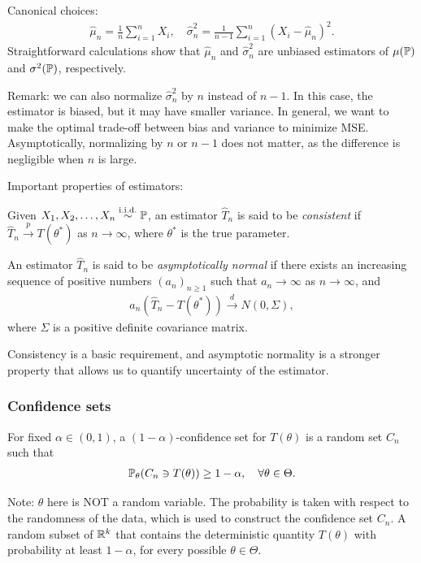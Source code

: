 \documentclass[11pt,letterpaper]{article}
\numberwithin{theorem}{lecture}
\numberwithin{proposition}{lecture}
\numberwithin{lemma}{lecture}
\numberwithin{claim}{lecture}
\numberwithin{corollary}{lecture}
\numberwithin{definition}{lecture}
\numberwithin{conjecture}{lecture}
\numberwithin{remark}{lecture}
\numberwithin{example}{lecture}
\numberwithin{equation}{lecture}
\begin{document}
Canonical choices:
\begin{align*}
  \widehat{\mu}_n = \frac{1}{n} \sum_{i=1}^n X_i, \quad \widehat{\sigma}_n^2 = \frac{1}{n - 1} \sum_{i=1}^n (X_i - \widehat{\mu}_n)^2.
\end{align*}
Straightforward calculations show that $\widehat{\mu}_n$ and $\widehat{\sigma}_n^2$ are unbiased estimators of $\mu({\mathbb{P}})$ and $\sigma^2({\mathbb{P}})$, respectively.

Remark: we can also normalize $\widehat{\sigma}_n^2$ by $n$ instead of $n-1$. In this case, the estimator is biased, but it may have smaller variance. In general, we want to make the optimal trade-off between bias and variance to minimize MSE. Asymptotically, normalizing by $n$ or $n-1$ does not matter, as the difference is negligible when $n$ is large.

Important properties of estimators:
\begin{definition}
  Given $X_1, X_2, \ldots, X_n \overset{\mathrm{i.i.d.}}{\sim} {\mathbb{P}}$, an estimator $\widehat{T}_n$ is said to be \emph{consistent} if $\widehat{T}_n \xrightarrow{p} T(\theta^*)$ as $n \to \infty$, where $\theta^*$ is the true parameter.
\end{definition}

\begin{definition}
  An estimator $\widehat{T}_n$ is said to be \emph{asymptotically normal} if there exists an increasing sequence of positive numbers $(a_n)_{n \geq 1}$ such that $a_n \to \infty$ as $n \to \infty$, and
  \begin{align*}
    a_n (\widehat{T}_n - T(\theta^*)) \xrightarrow{d} N(0, \Sigma),
  \end{align*}
  where $\Sigma$ is a positive definite covariance matrix.
\end{definition}
Consistency is a basic requirement, and asymptotic normality is a stronger property that allows us to quantify uncertainty of the estimator.

\subsubsection{Confidence sets}
\begin{definition}
 For fixed $\alpha \in (0,1)$, a $(1 - \alpha)$-confidence set for $T(\theta)$ is a random set $C_n$ such that
  \begin{align*}
    {\mathbb{P}}_\theta(C_n \ni T(\theta)) \geq 1 - \alpha, \quad \forall \theta \in \Theta.
  \end{align*}
\end{definition}
Note: $\theta$ here is NOT a random variable. The probability is taken with respect to the randomness of the data, which is used to construct the confidence set $C_n$. A random subset of $\mathbb{R}^k$ that contains the deterministic quantity $T(\theta)$ with probability at least $1 - \alpha$, for every possible $\theta \in \Theta$.
\end{document}
